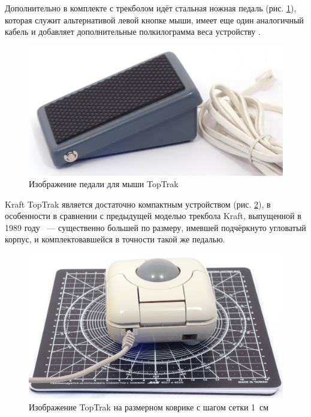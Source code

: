 \documentclass[11pt, a4paper]{article}
\begin{document}
Дополнительно в комплекте с трекболом идёт стальная ножная педаль (рис. \ref{fig:TopTrakPedal}), которая служит альтернативой левой кнопке мыши, имеет еще один аналогичный кабель и добавляет дополнительные полкилограмма веса устройству \cite{mouses}.

\begin{figure}[h]
    \centering
    \includegraphics[scale=0.45]{1990_kraft_toptrack/pedal_30.jpg}
    \caption{Изображение педали для мыши TopTrak}
    \label{fig:TopTrakPedal}
\end{figure}


Kraft TopTrak является достаточно компактным устройством (рис. \ref{fig:TopTrakSize}), в особенности в сравнении с предыдущей моделью трекбола Kraft, выпущенной в 1989 году ~--- существенно большей по размеру, имевшей подчёркнуто угловатый корпус, и комплектовавшейся в точности такой же педалью.

\begin{figure}[h]
    \centering
    \includegraphics[scale=0.35]{1990_kraft_toptrack/2.6_30.jpg}
    \caption{Изображение TopTrak на размерном коврике с шагом сетки 1~см}
    \label{fig:TopTrakSize}
\end{figure}
\end{document}
